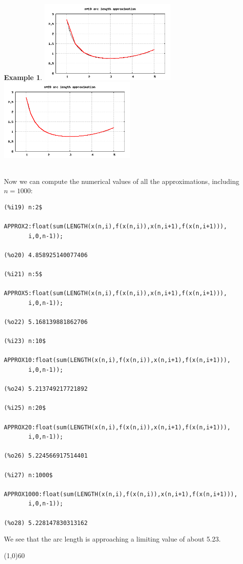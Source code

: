 \documentclass[10.5pt,twoside]{report}
\theoremstyle{definition}
\newtheorem{exmp}{Example}[section]
\begin{document}
\begin{exmp}
\includegraphics[width=2.7in]{example_3_3_1_3}
\includegraphics[width=2.7in]{example_3_3_1_4}

${}$\\

Now we can compute the numerical values of all the approximations, including $n=1000$:

\begin{verbatim}
(%i19) n:2$
       APPROX2:float(sum(LENGTH(x(n,i),f(x(n,i)),x(n,i+1),f(x(n,i+1))),
       i,0,n-1));

(%o20) 4.858925140077406

(%i21) n:5$
       APPROX5:float(sum(LENGTH(x(n,i),f(x(n,i)),x(n,i+1),f(x(n,i+1))),
       i,0,n-1));

(%o22) 5.168139881862706

(%i23) n:10$
       APPROX10:float(sum(LENGTH(x(n,i),f(x(n,i)),x(n,i+1),f(x(n,i+1))),
       i,0,n-1));

(%o24) 5.213749217721892

(%i25) n:20$
       APPROX20:float(sum(LENGTH(x(n,i),f(x(n,i)),x(n,i+1),f(x(n,i+1))),
       i,0,n-1));

(%o26) 5.224566917514401

(%i27) n:1000$
       APPROX1000:float(sum(LENGTH(x(n,i),f(x(n,i)),x(n,i+1),f(x(n,i+1))),
       i,0,n-1));

(%o28) 5.228147830313162
\end{verbatim}

We see that the arc length is approaching a limiting value of about 5.23.
\end{exmp}

\line(1,0){60}
\linethickness{0.5mm}
\end{document}
